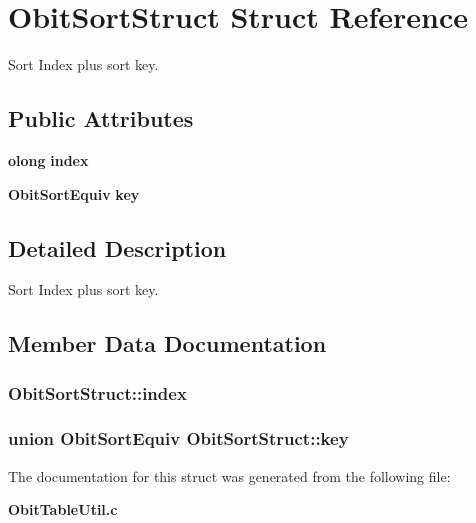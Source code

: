 \section{Obit\-Sort\-Struct Struct Reference}
\label{structObitSortStruct}
Sort Index plus sort key.  


\subsection*{Public Attributes}
\begin{CompactItemize}
\item 
{\bf olong} {\bf index}
\item 
{\bf Obit\-Sort\-Equiv} {\bf key}
\end{CompactItemize}


\subsection{Detailed Description}
Sort Index plus sort key. 



\subsection{Member Data Documentation}
\subsubsection{ {\bf Obit\-Sort\-Struct::index}}\label{structObitSortStruct_o0}


\subsubsection{\setlength{\rightskip}{0pt plus 5cm}union {\bf Obit\-Sort\-Equiv} {\bf Obit\-Sort\-Struct::key}}\label{structObitSortStruct_o1}




The documentation for this struct was generated from the following file:\begin{CompactItemize}
\item 
{\bf Obit\-Table\-Util.c}\end{CompactItemize}
